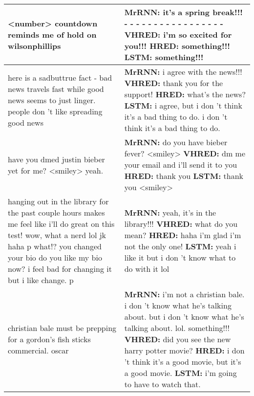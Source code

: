 \documentclass{article}
\begin{document}
\begin{table}[ht]
\begin{tabular}{p{45mm}|p{80mm}}
     <number> countdown reminds me of hold on wilsonphillips & \textbf{MrRNN:} it's a spring break!!! - - - - - - - - - - - - - - - - -  \newline \textbf{VHRED:} i'm so excited for you!!! \newline \textbf{HRED:} something!!! \newline \textbf{LSTM:} something!!!  \\ \hline 
     here is a sadbuttrue fact - bad news travels fast while good news seems to just linger. people don 't like spreading good news & \textbf{MrRNN:} i agree with the news!!!  \newline \textbf{VHRED:} thank you for the support! \newline \textbf{HRED:} what's the news? \newline \textbf{LSTM:} i agree, but i don 't think it's a bad thing to do. i don 't think it's a bad thing to do.  \\ \hline 
     have you dmed justin bieber yet for me? <smiley>  yeah. & \textbf{MrRNN:} do you have bieber fever? <smiley>  \newline \textbf{VHRED:} dm me your email and i'll send it to you \newline \textbf{HRED:} thank you \newline \textbf{LSTM:} thank you <smiley>  \\ \hline 
     hanging out in the library for the past couple hours makes me feel like i'll do great on this test!  wow, what a nerd lol jk haha p what!? you changed your bio  do you like my bio now? i feel bad for changing it but i like change. p & \textbf{MrRNN:} yeah, it's in the library!!!  \newline \textbf{VHRED:} what do you mean? \newline \textbf{HRED:} haha i'm glad i'm not the only one! \newline \textbf{LSTM:} yeah i like it but i don 't know what to do with it lol  \\ \hline 
     christian bale must be prepping for a gordon's fish sticks commercial. oscar & \textbf{MrRNN:} i'm not a christian bale. i don 't know what he's talking about. but i don 't know what he's talking about. lol. something!!!  \newline \textbf{VHRED:} did you see the new harry potter movie? \newline \textbf{HRED:} i don 't think it's a good movie, but it's a good movie. \newline \textbf{LSTM:} i'm going to have to watch that.  \\ \hline 

\end{tabular}
\end{table}
\end{document}
